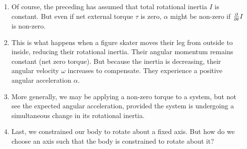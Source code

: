 \begin{enumerate}
  \item Of course, the preceding has assumed that total rotational
  inertia $I$ is constant. But even if net external torque $\tau$ is
  zero, $\alpha$ might be non-zero if $\frac{\partial }{\partial t} I$ is non-zero.

  \item This is what happens when a figure skater moves their leg from
  outside to inside, reducing their rotational inertia. Their angular
  momentum remains constant (net zero torque). But because the inertia
  is decreasing, their angular velocity $\omega$ increases to
  compensate. They experience a positive angular acceleration $\alpha$.

  \item More generally, we may be applying a non-zero torque to a
  system, but not see the expected angular acceleration, provided the
  system is undergoing a simultaneous change in its rotational inertia.

  \item Last, we constrained our body to rotate about a fixed axis. But
  how do we choose an axis such that the body is constrained to rotate
  about it?
\end{enumerate}
